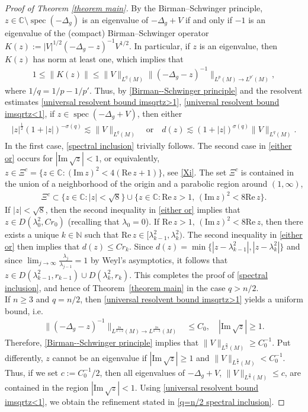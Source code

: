 \documentclass[12pt]{amsart}
\newcommand{\N}{{\mathbb N}}
\newcommand{\C}{{\mathbb C}}
\newcommand\re{\mathrm{Re}\,}
\newcommand\im{\mathrm{Im}\,}
\DeclareMathOperator{\spec}{spec}
\begin{document}
\begin{proof}[Proof of Theorem \ref{theorem main}]
 By the Birman--Schwinger principle, $z\in\C\setminus\spec(-\Delta_g)$ is an eigenvalue of $-\Delta_g+V$ if and only if $-1$ is an eigenvalue of the (compact) Birman--Schwinger operator $K(z):=|V|^{1/2}(-\Delta_g-z)^{-1}V^{1/2}$. In particular, if $z$ is an eigenvalue, then $K(z)$ has norm at least one, which implies that
\begin{align}\label{Birman--Schwinger principle}
    1\leq \|K(z)\|\leq \|V\|_{L^q(M)}\|(-\Delta_g-z)^{-1}\|_{L^{p}(M)\to L^{p'}(M)},
\end{align}
where $1/q=1/p-1/p'$. Thus, by \eqref{Birman--Schwinger principle} and the resolvent estimates \eqref{universal resolvent bound imsqrtz>1}, \eqref{universal resolvent bound imsqrtz<1}, if $z\in\spec(-\Delta_g+V)$, then either 
\begin{align}\label{either or}
 |z|^{\frac{1}{2}}(1+|z|)^{-\sigma(q)}\lesssim \|V\|_{L^q(M)}
\quad \mbox{or}\quad d(z)\lesssim (1+|z|)^{\sigma(q)}\|V\|_{L^q(M)}.
\end{align}
In the first case, \eqref{spectral inclusion} trivially follows.
The second case in \eqref{either or} occurs for $|\im\sqrt{z}|<1$, or equivalently, $z\in \Xi^c=\{z\in\C:(\im z)^2< 4(\re z+1)\}$, see \eqref{Xi}. The set $\Xi^c$ is contained in the union of a neighborhood of the origin and a parabolic region around $(1,\infty)$,
\begin{align}
 \Xi^c\subset \{z\in\C:|z|<\sqrt{8}\}\cup \{z\in\C:\re z>1,\,(\im z)^2< 8\re z\}.   
\end{align}
If $|z|<\sqrt{8}$, then the second inequality in \eqref{either or} implies that $z\in D(\lambda_0^2,Cr_0)$ (recalling that $\lambda_0=0$). If $\re z>1,\,(\im z)^2< 8\re z$, then there exists a unique $k\in\N$ such that $\re z\in [\lambda_{k-1}^2,\lambda_{k}^2)$. The second inequality in \eqref{either or} then implies that $d(z)\leq Cr_k$. Since $d(z)=\min\{|z-\lambda_{k-1}^2|,|z-\lambda_{k}^2|\}$ and since $\lim_{j\to\infty}\frac{\lambda_j}{\lambda_{j-1}}=1$ by Weyl's asymptotics, it follows that $z\in D(\lambda_{k-1}^2,r_{k-1})\cup D(\lambda_{k}^2,r_{k})$. This completes the proof of \eqref{spectral inclusion}, and hence of Theorem~\ref{theorem main} in the case $q>n/2$.\\

If $n\geq 3$ and $q=n/2$, then \eqref{universal resolvent bound imsqrtz>1} yields a uniform bound, i.e.
\begin{align}
    \|(-\Delta_g-z)^{-1}\|_{L^{\frac{2n}{n+2}}(M)\to L^{\frac{2n}{n-2}}(M)}
&\leq C_0,\quad |\im\sqrt{z}|\geq 1.
\end{align}
Therefore, \eqref{Birman--Schwinger principle} implies that 
$\|V\|_{L^{\frac{n}{2}}(M)}\geq C_0^{-1}$. Put differently, $z$ cannot be an eigenvalue if $|\im\sqrt{z}|\geq 1$ and $\|V\|_{L^{\frac{n}{2}}(M)}<C_0^{-1}$. Thus, if we set $c:=C_0^{-1}/2$, then all eigenvalues of $-\Delta_g+V$, $\|V\|_{L^{\frac{n}{2}}(M)}\leq c$, are contained in the region $|\im\sqrt{z}|<1$. Using \eqref{universal resolvent bound imsqrtz<1}, we obtain the refinement stated in \eqref{q=n/2 spectral inclusion}.
\end{proof}
\end{document}
